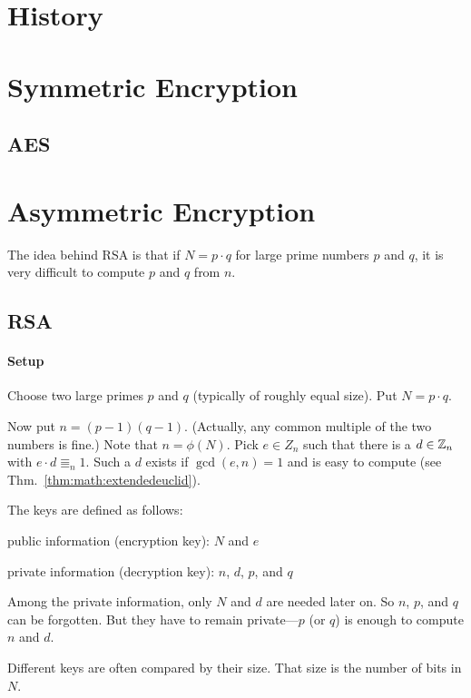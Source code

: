 \section{History}


\section{Symmetric Encryption}

\subsection{AES}

\section{Asymmetric Encryption}

The idea behind RSA is that if $N=p\cdot q$ for large prime numbers $p$ and $q$, it is very difficult to compute $p$ and $q$ from $n$.

\subsection{RSA}

\paragraph{Setup}
Choose two large primes $p$ and $q$ (typically of roughly equal size).
Put $N=p\cdot q$.

Now put $n=(p-1)(q-1)$. (Actually, any common multiple of the two numbers is fine.)
Note that $n=\phi(N)$.
Pick $e\in Z_n$ such that there is a $d\in\mathbb{Z}_n$ with $e\cdot d\Equiv_n 1$.
Such a $d$ exists if $\gcd(e,n)=1$ and is easy to compute (see Thm.~\ref{thm:math:extendedeuclid}).

The keys are defined as follows:
\begin{compactitem}
 \item public information (encryption key): $N$ and $e$
 \item private information (decryption key): $n$, $d$, $p$, and $q$
\end{compactitem}
Among the private information, only $N$ and $d$ are needed later on.
So $n$, $p$, and $q$ can be forgotten.
But they have to remain private---$p$ (or $q$) is enough to compute $n$ and $d$.

Different keys are often compared by their size.
That size is the number of bits in $N$.


